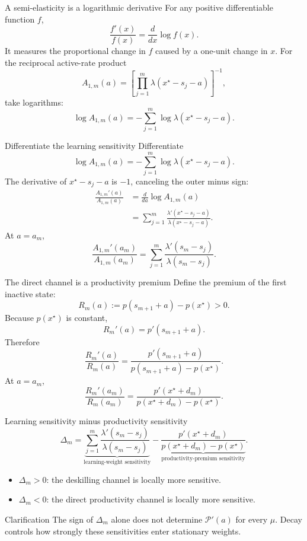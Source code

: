 \documentclass[aspectratio=169,10pt]{beamer}
\newcommand{\calP}{\mathcal{P}}
\begin{document}
\begin{frame}{A semi-elasticity is a logarithmic derivative}
For any positive differentiable function $f$,
\[
\frac{f'(x)}{f(x)}
=\frac{d}{dx}\log f(x).
\]
It measures the proportional change in $f$ caused by a one-unit change in $x$.
\vspace{3mm}
For the reciprocal active-rate product
\[
A_{1,m}(a)=
\left[
\prod_{j=1}^{m}
\lambda(x^\star-s_j-a)
\right]^{-1},
\]
take logarithms:
\[
\log A_{1,m}(a)
=-\sum_{j=1}^m
\log\lambda(x^\star-s_j-a).
\]
\end{frame}

\begin{frame}{Differentiate the learning sensitivity}
Differentiate
\[
\log A_{1,m}(a)
=-\sum_{j=1}^m
\log\lambda(x^\star-s_j-a).
\]
The derivative of $x^\star-s_j-a$ is $-1$, canceling the outer minus sign:
\begin{align*}
\frac{A_{1,m}'(a)}{A_{1,m}(a)}
&=\frac{d}{da}\log A_{1,m}(a)\\
&=\sum_{j=1}^m
\frac{\lambda'(x^\star-s_j-a)}
{\lambda(x^\star-s_j-a)}.
\end{align*}
At $a=a_m$,
\[
\frac{A_{1,m}'(a_m)}{A_{1,m}(a_m)}
=
\sum_{j=1}^m
\frac{\lambda'(s_m-s_j)}
{\lambda(s_m-s_j)}.
\]
\end{frame}

\begin{frame}{The direct channel is a productivity premium}
Define the premium of the first inactive state:
\[
R_m(a):=
p(s_{m+1}+a)-p(x^\star)>0.
\]
Because $p(x^\star)$ is constant,
\[
R_m'(a)=p'(s_{m+1}+a).
\]
Therefore
\[
\frac{R_m'(a)}{R_m(a)}
=
\frac{p'(s_{m+1}+a)}
{p(s_{m+1}+a)-p(x^\star)}.
\]
At $a=a_m$,
\[
\frac{R_m'(a_m)}{R_m(a_m)}
=
\frac{p'(x^\star+d_m)}
{p(x^\star+d_m)-p(x^\star)}.
\]
\end{frame}

\begin{frame}{Learning sensitivity minus productivity sensitivity}
\[
\boxed{
\Delta_m=
\underbrace{
\sum_{j=1}^m
\frac{\lambda'(s_m-s_j)}
{\lambda(s_m-s_j)}
}_{\text{learning-weight sensitivity}}
-
\underbrace{
\frac{p'(x^\star+d_m)}
{p(x^\star+d_m)-p(x^\star)}
}_{\text{productivity-premium sensitivity}}.}
\]
\begin{itemize}
  \item $\Delta_m>0$: the deskilling channel is locally more sensitive.
  \item $\Delta_m<0$: the direct productivity channel is locally more sensitive.
\end{itemize}
\begin{alertblock}{Clarification}
The sign of $\Delta_m$ alone does not determine $\calP'(a)$ for every $\mu$. Decay controls how strongly these sensitivities enter stationary weights.
\end{alertblock}
\end{frame}
\end{document}
